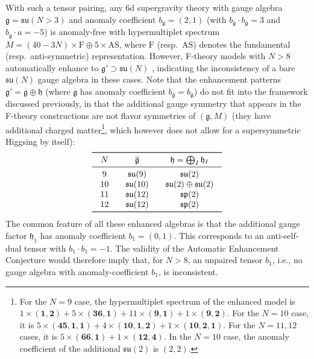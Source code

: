 \documentclass[11pt, a4paper]{article}
\newcommand*{\fkg}{\ensuremath{\mathfrak{g}}}
\newcommand*{\fkh}{\ensuremath{\mathfrak{h}}}
\newcommand*{\fksu}{\ensuremath{\mathfrak{su}}}
\newcommand*{\fksp}{\ensuremath{\mathfrak{sp}}}
\begin{document}
With such a tensor pairing, any 6d supergravity theory with gauge algebra $\fkg = \fksu(N>3)$ and anomaly coefficient $b_\fkg = (2,1)$ (with $b_\fkg \cdot b_\fkg = 3$ and $b_\fkg \cdot a = -5$) is anomaly-free with hypermultiplet spectrum $M = (40-3N) \times \bm{\mathrm{F}} \oplus 5 \times \bm{\mathrm{AS}}$, where $\bm{\mathrm{F}}$ (resp.~$\bm{\mathrm{AS}}$) denotes the fundamental (resp.~anti-symmetric) representation.
However, F-theory models with $N>8$ automatically enhance to $\fkg' \supset \fksu(N)$ \cite{Raghuram:2020vxm}, indicating the inconsistency of a bare $\fksu(N)$ gauge algebra in these cases.
Note that the enhancement patterns $\fkg' = \overline{\fkg} \oplus \fkh$ (where $\overline{\fkg}$ has anomaly coefficient $b_{\overline{\fkg}} = b_\fkg$) do not fit into the framework discussed previously, in that the additional gauge symmetry that appears in the F-theory constructions are not flavor symmetries of $(\fkg,M)$ (they have additional charged matter\footnote{
For the $N = 9$ case, the hypermultiplet spectrum of the enhanced model is $1\times(\bm{1}, \bm{2}) + 5\times(\bm{36}, \bm{1}) + 11\times(\bm{9}, \bm{1}) + 1\times(\bm{9}, \bm{2})$. For the $N = 10$ case, it is $5\times(\bm{45}, \bm{1}, \bm{1}) + 4\times(\bm{10}, \bm{1}, \bm{2}) + 1\times(\bm{10}, \bm{2}, \bm{1})$. For the $N = 11, 12$ cases, it is $5\times(\bm{66}, \bm{1}) + 1\times(\bm{12}, \bm{4})$.
In the $N=10$ case, the anomaly coefficient of the additional $\fksu(2)$ is $(2, 2)$.
}, which however does not allow for a supersymmetric Higgsing by itself):
\begin{equation}\label{eq:F1_enhancements}
{\arraycolsep = 10pt
\begin{array}{*{3}{c}} \toprule
    N & \overline{\fkg} & \fkh = \bigoplus_I \fkh_I \\ \midrule
    9 & \fksu(9) & \fksu(2) \\
    10 & \fksu(10) & \fksu(2) \oplus \fksu(2) \\
    11 & \fksu(12) & \fksp(2) \\
    12 & \fksu(12) & \fksp(2) \\ \bottomrule
\end{array}}
\end{equation}
The common feature of all these enhanced algebras is that the additional gauge factor $\fkh_1$ has anomaly coefficient $b_1 = (0,1)$.
This corresponds to an anti-self-dual tensor with $b_1 \cdot b_1 = -1$.
The validity of the Automatic Enhancement Conjecture would therefore imply that, for $N>8$, an unpaired tensor $b_1$, i.e., no gauge algebra with anomaly-coefficient $b_1$, is inconsistent.
\end{document}
